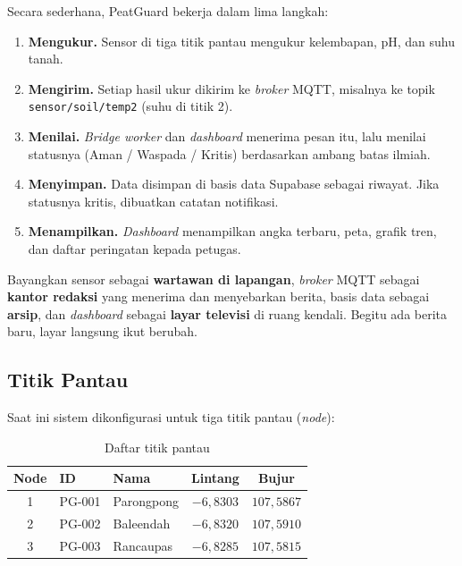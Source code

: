 \documentclass[11pt,a4paper]{article}
\newcommand{\kode}[1]{\texttt{#1}}
\begin{document}
Secara sederhana, PeatGuard bekerja dalam lima langkah:

\begin{enumerate}
  \item \textbf{Mengukur.} Sensor di tiga titik pantau mengukur kelembapan, pH, dan suhu tanah.
  \item \textbf{Mengirim.} Setiap hasil ukur dikirim ke \textit{broker} MQTT, misalnya ke topik
        \kode{sensor/soil/temp2} (suhu di titik 2).
  \item \textbf{Menilai.} \textit{Bridge worker} dan \textit{dashboard} menerima pesan itu,
        lalu menilai statusnya (Aman / Waspada / Kritis) berdasarkan ambang batas ilmiah.
  \item \textbf{Menyimpan.} Data disimpan di basis data Supabase sebagai riwayat.
        Jika statusnya kritis, dibuatkan catatan notifikasi.
  \item \textbf{Menampilkan.} \textit{Dashboard} menampilkan angka terbaru, peta, grafik tren,
        dan daftar peringatan kepada petugas.
\end{enumerate}

\begin{catatan}
Bayangkan sensor sebagai \textbf{wartawan di lapangan}, \textit{broker} MQTT sebagai
\textbf{kantor redaksi} yang menerima dan menyebarkan berita, basis data sebagai
\textbf{arsip}, dan \textit{dashboard} sebagai \textbf{layar televisi} di ruang kendali.
Begitu ada berita baru, layar langsung ikut berubah.
\end{catatan}

\subsection{Titik Pantau}
Saat ini sistem dikonfigurasi untuk tiga titik pantau (\textit{node}):

\begin{table}[H]
\centering
\caption{Daftar titik pantau}
\label{tab:titik}
\begin{tabular}{@{}cllcc@{}}
\toprule
\textbf{Node} & \textbf{ID} & \textbf{Nama} & \textbf{Lintang} & \textbf{Bujur} \\
\midrule
1 & PG-001 & Parongpong & $-6{,}8303$ & $107{,}5867$ \\
2 & PG-002 & Baleendah  & $-6{,}8320$ & $107{,}5910$ \\
3 & PG-003 & Rancaupas  & $-6{,}8285$ & $107{,}5815$ \\
\bottomrule
\end{tabular}
\end{table}
\end{document}
